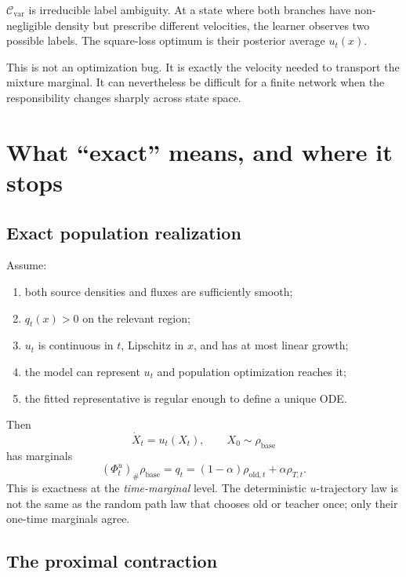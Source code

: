 \documentclass[11pt,a4paper]{article}
\theoremstyle{plain}
\theoremstyle{definition}
\begin{document}
$\mathcal C_{\mathrm{var}}$ is irreducible label ambiguity.  At a state where both branches have
non-negligible density but prescribe different velocities, the learner observes two possible
labels.  The square-loss optimum is their posterior average $u_t(x)$.

This is not an optimization bug.  It is exactly the velocity needed to transport the mixture
marginal.  It can nevertheless be difficult for a finite network when the responsibility changes
sharply across state space.

\section{What ``exact'' means, and where it stops}
\label{sec:exactness}

\subsection{Exact population realization}

Assume:
\begin{enumerate}[leftmargin=1.6em]
\item both source densities and fluxes are sufficiently smooth;
\item $q_t(x)>0$ on the relevant region;
\item $u_t$ is continuous in $t$, Lipschitz in $x$, and has at most linear growth;
\item the model can represent $u_t$ and population optimization reaches it;
\item the fitted representative is regular enough to define a unique ODE.
\end{enumerate}
Then
\begin{equation}
\dot X_t=u_t(X_t),
\qquad
X_0\sim\rho_{\mathrm{base}}
\label{eq:mixture-ode}
\end{equation}
has marginals
\begin{equation}
(\Phi_t^u)_\#\rho_{\mathrm{base}}
=q_t
=(1-\alpha)\rho_{\mathrm{old},t}+\alpha\rho_{T,t}.
\label{eq:exact-mixture}
\end{equation}
This is exactness at the \emph{time-marginal} level.  The deterministic $u$-trajectory law is not
the same as the random path law that chooses old or teacher once; only their one-time marginals
agree.

\subsection{The proximal contraction}
\end{document}
